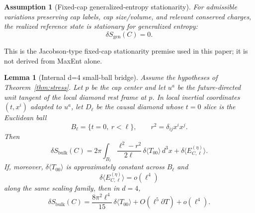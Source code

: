 \documentclass[11pt]{article}
\newtheorem{lemma}[theorem]{Lemma}
\newtheorem{assumption}[theorem]{Assumption}
\begin{document}
\begin{assumption}[Fixed-cap generalized-entropy stationarity]\label{ass:equilibrium}
For admissible variations preserving cap labels, cap size/volume, and relevant conserved charges, the realized reference state is stationary for generalized entropy:
\[
\delta S_{\mathrm{gen}}(C)=0.
\]
\end{assumption}

This is the Jacobson-type fixed-cap stationarity premise used in this paper; it is not
derived from MaxEnt alone.

\begin{lemma}[Internal d=4 small-ball bridge]\label{lem:smallball}
Assume the hypotheses of Theorem~\ref{thm:stress}. Let $p$ be the cap center and let $u^a$ be the future-directed unit tangent of the local diamond rest frame at $p$. In local inertial coordinates $(t,x^i)$ adapted to $u^a$, let $D_\ell$ be the causal diamond whose $t=0$ slice is the Euclidean ball
\[
B_\ell=\{t=0,\ r<\ell\},
\qquad
r^2=\delta_{ij}x^ix^j.
\]
Then
\[
\delta S_{\mathrm{bulk}}(C)
=
2\pi\int_{B_\ell}\frac{\ell^2-r^2}{2\ell}\,\delta\langle T_{00}\rangle\,d^3x
+
\delta\langle E^{(\eta)}_{C,\ell}\rangle.
\]
If, moreover, $\delta\langle T_{00}\rangle$ is approximately constant across $B_\ell$ and
\[
\delta\langle E^{(\eta)}_{C,\ell}\rangle=o(\ell^4)
\]
along the same scaling family, then in $d=4$,
\[
\delta S_{\mathrm{bulk}}(C)
=
\frac{8\pi^2\ell^4}{15}\,\delta\langle T_{00}\rangle
+O(\ell^5\partial T)+o(\ell^4).
\]
\end{lemma}
\end{document}
